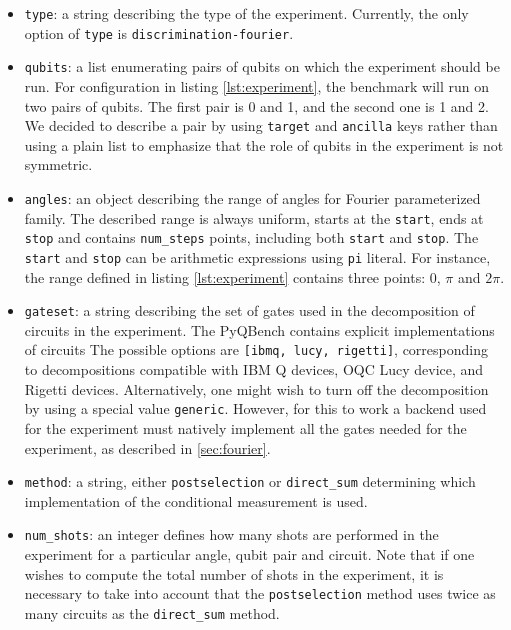 \documentclass[preprint,12pt, a4paper, dvipsnames]{elsarticle}
\newcommand{\1}{{\rm 1\hspace{-0.9mm}l}}
\theoremstyle{definition}
\begin{document}
\begin{itemize}
	\item \texttt{type}: a string describing the type of the experiment. Currently, the only option of  \texttt{type} is \texttt{discrimination-fourier}.
	\item \texttt{qubits}: a list enumerating pairs of qubits on which the experiment should be run.
	For configuration in listing \ref{lst:experiment}, the benchmark will run on two pairs of qubits. The first pair is 0 and 1, and
	the second one is 1 and 2. We decided to describe a pair by using \texttt{target} and
	\texttt{ancilla} keys rather than using a plain list to emphasize that the role of qubits in the
	experiment is not symmetric.
	\item \texttt{angles}: an object describing the range of angles for Fourier parameterized
	family. The described range is always uniform, starts at the \texttt{start}, ends at
	\texttt{stop} and contains \texttt{num\_steps} points, including both \texttt{start} and
	\texttt{stop}. The \texttt{start} and \texttt{stop} can be arithmetic expressions using
	\texttt{pi} literal. For instance, the range defined in listing \ref{lst:experiment} contains
	three points: 0, $\pi$ and $2\pi$.
 	 \item \texttt{gateset}: a string describing the set of gates used in the decomposition of
 	 circuits in the experiment. The PyQBench contains explicit implementations of circuits The
 	 possible options are \texttt{[ibmq, lucy, rigetti]}, corresponding to decompositions
 	 compatible with IBM Q devices, OQC Lucy device, and Rigetti devices. Alternatively, one might
 	 wish to turn off the decomposition by using a special value \texttt{generic}. However, for this
 	 to work a backend used for the experiment must natively implement all the gates needed for the
 	 experiment, as described in \ref{sec:fourier}.
 	\item \texttt{method}: a string, either \texttt{postselection} or \texttt{direct\_sum}
 	determining which implementation of the conditional measurement is used.
 	\item \texttt{num\_shots}: an integer defines how many shots are performed in the experiment for
 	a particular angle, qubit pair and circuit. Note that if one wishes to compute the total number
 	of shots in the experiment, it is necessary to take into account that the \texttt{postselection}
 	method uses twice as many circuits as the \texttt{direct\_sum} method.
\end{itemize}
\end{document}
